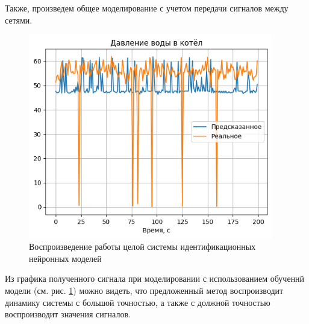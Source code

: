 Также, произведем общее моделирование с учетом передачи сигналов между сетями. 

\begin{figure}[H]
  \begin{center}
    \includegraphics[width=0.95\textwidth]{figures/test/all_res.png}
  \end{center}
  \caption{Воспроизведение работы целой системы идентификационных нейронных
  моделей}\label{fig:test:plot:system}
\end{figure}

Из графика полученного сигнала при моделировании с использованием обученнй
модели (см. рис. \ref{fig:test:plot:system}) можно видеть, что предложенный
метод воспроизводит динамику системы с большой точностью, а также с должной
точностью воспроизводит значения сигналов.
